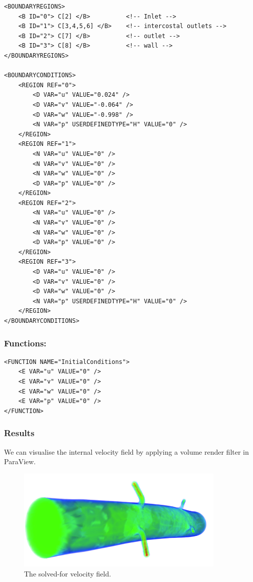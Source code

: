 \begin{lstlisting}[style=XMLStyle]
<BOUNDARYREGIONS>
    <B ID="0"> C[2] </B>          <!-- Inlet -->
    <B ID="1"> C[3,4,5,6] </B>    <!-- intercostal outlets -->
    <B ID="2"> C[7] </B>          <!-- outlet -->
    <B ID="3"> C[8] </B>          <!-- wall -->
</BOUNDARYREGIONS>

<BOUNDARYCONDITIONS>
    <REGION REF="0">
        <D VAR="u" VALUE="0.024" />
        <D VAR="v" VALUE="-0.064" />
        <D VAR="w" VALUE="-0.998" />
        <N VAR="p" USERDEFINEDTYPE="H" VALUE="0" />
    </REGION>
    <REGION REF="1">
        <N VAR="u" VALUE="0" />
        <N VAR="v" VALUE="0" />
        <N VAR="w" VALUE="0" />
        <D VAR="p" VALUE="0" />
    </REGION>
    <REGION REF="2">
        <N VAR="u" VALUE="0" />
        <N VAR="v" VALUE="0" />
        <N VAR="w" VALUE="0" />
        <D VAR="p" VALUE="0" />
    </REGION>
    <REGION REF="3">
        <D VAR="u" VALUE="0" />
        <D VAR="v" VALUE="0" />
        <D VAR="w" VALUE="0" />
        <N VAR="p" USERDEFINEDTYPE="H" VALUE="0" />
    </REGION>
</BOUNDARYCONDITIONS>
\end{lstlisting}

\subsubsection{Functions:~}
\begin{lstlisting}[style=XMLStyle]
<FUNCTION NAME="InitialConditions">
    <E VAR="u" VALUE="0" />
    <E VAR="v" VALUE="0" />
    <E VAR="w" VALUE="0" />
    <E VAR="p" VALUE="0" />
</FUNCTION>
\end{lstlisting}

\subsubsection{Results}
We can visualise the internal velocity field by applying a volume render filter in ParaView.

\begin{figure}
\begin{center}
\includegraphics[width=10cm]{Figures/velocityRendered.png}
\caption{The solved-for velocity field.}
\end{center}
\end{figure}

